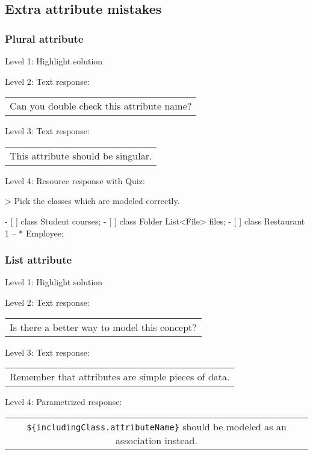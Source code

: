 \subsection{Extra attribute mistakes}

\subsubsection{Plural attribute}

\noindent Level 1: Highlight solution \medskip

\noindent Level 2: Text response: \medskip

\begin{tabular}{|c}
Can you double check this attribute name?
\end{tabular} \medskip

\noindent Level 3: Text response: \medskip

\begin{tabular}{|c}
This attribute should be singular.
\end{tabular} \medskip

\noindent Level 4: Resource response with Quiz:

> Pick the classes which are modeled correctly.

- [ ] class Student { courses; }
- [ ] class Folder { List<File> files; }
- [ ] class Restaurant { 1 -- * Employee; }


\subsubsection{List attribute}

\noindent Level 1: Highlight solution \medskip

\noindent Level 2: Text response: \medskip

\begin{tabular}{|c}
Is there a better way to model this concept?
\end{tabular} \medskip

\noindent Level 3: Text response: \medskip

\begin{tabular}{|c}
Remember that attributes are simple pieces of data.
\end{tabular} \medskip

\noindent Level 4: Parametrized response: \medskip

\begin{tabular}{|c}
\verb|${includingClass.attributeName}| should be modeled as an association instead.
\end{tabular} \medskip

